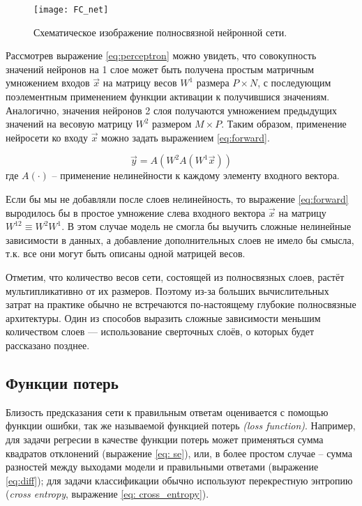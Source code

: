 \begin{figure}[h!]
    \begin{center}
   	    \texttt{[image: FC\_net]}
   	\end{center}
   	\caption{Схематическое изображение полносвязной нейронной сети.}
   	\label{tikzpicture: fc_net}
\end{figure}

Рассмотрев выражение \ref{eq:perceptron} можно увидеть, что 
совокупность значений нейронов на 1 слое может быть получена 
простым матричным умножением входов $\vec{x}$ на матрицу весов
 $W^1$ размера $P \times N$, с последующим поэлементным применением 
функции активации к получившися значениям. Аналогично, значения нейронов
2 слоя получаются умножением предыдущих значений на весовую матрицу
$W^2$ размером $M \times P$. Таким образом, применение нейросети
ко входу $\vec{x}$ можно задать выражением \ref{eq:forward}.

\begin{equation}\label{eq:forward}
	   \vec{y} = A(W^{2} A(W^{1} \vec{x}))
\end{equation}
где $A(\cdot)$ -- применение нелинейности к каждому элементу входного 
вектора.

\indent
\indent
Если бы мы не добавляли после слоев нелинейность, то выражение \ref{eq:forward}
выродилось бы в простое умножение слева входного вектора $\vec{x}$ на матрицу
$W^{12} \equiv W^{2} W^{1}$. В этом случае модель не смогла бы выучить 
сложные нелинейные зависимости в данных, а добавление дополнительных слоев
не имело бы смысла, т.к. все они могут быть описаны одной матрицей весов.

\indent
\indent
Отметим, что количество весов сети, состоящей из полносвязных слоев, растёт
мультипликативно от их размеров. Поэтому из-за больших вычислительных затрат
 на практике обычно не встречаются по-настоящему глубокие полносвязные архитектуры.
 Один из способов выразить сложные зависимости меньшим количеством слоев ---
 использование сверточных слоёв, о которых будет рассказано позднее.


\subsection{Функции потерь}

\indent
\indent
Близость предсказания сети к правильным ответам оценивается
с помощью функции ошибки, так же называемой 
 функцией потерь \textit{(loss function)}. 
Например, для задачи регресии в качестве функции потерь
может применяться сумма квадратов отклонений
 (выражение \ref{eq: se}),
 или, в более простом случае -- сумма разностей между выходами модели
  и правильными ответами (выражение \ref{eq:diff});
для задачи классификации обычно используют перекрестную энтропию 
(\textit{cross entropy}, выражение \ref{eq: cross_entropy}).


